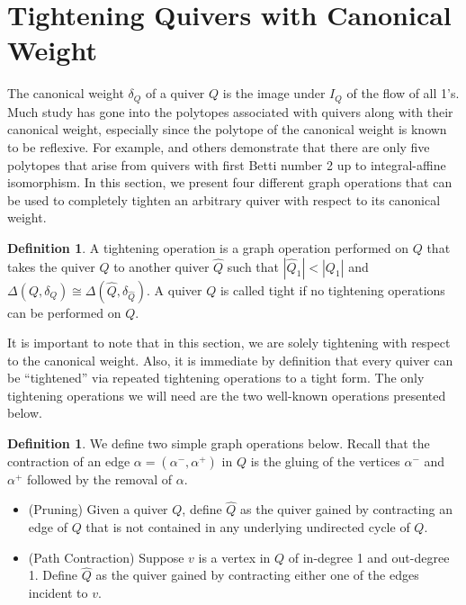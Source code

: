\documentclass[12pt]{amsart}
\theoremstyle{plain}
\theoremstyle{definition}
\newtheorem{definition}[theorem]{Definition}
\begin{document}
\section{Tightening Quivers with Canonical Weight}

The canonical weight $\delta_Q$ of a quiver $Q$ is the image under $I_Q$ of the flow of all 1's. Much study has gone into the polytopes associated with quivers along with their canonical weight, especially since the polytope of the canonical weight is known to be reflexive. For example, \cite{domokos2016equations} and others demonstrate that there are only five polytopes that arise from quivers with first Betti number 2 up to integral-affine isomorphism. In this section, we present four different graph operations that can be used to completely tighten an arbitrary quiver with respect to its canonical weight.

\begin{definition}
    A tightening operation is a graph operation performed on $Q$ that takes the quiver $Q$ to another quiver $\hat Q$ such that $|\hat Q_1| < |Q_1|$ and $\Delta(Q, \delta_Q) \cong \Delta(\hat Q, \delta_{\hat Q})$. A quiver $Q$ is called tight if no tightening operations can be performed on $Q$.
\end{definition}

It is important to note that in this section, we are solely tightening with respect to the canonical weight. Also, it is immediate by definition that every quiver can be ``tightened'' via repeated tightening operations to a tight form. The only tightening operations we will need are the two well-known operations presented below.

\begin{definition} We define two simple graph operations below. Recall that the contraction of an edge $\alpha = (\alpha^- , \alpha^+)$ in $Q$ is the gluing of the vertices $\alpha^-$ and $\alpha^+$ followed by the removal of $\alpha$.
\begin{itemize}
    \item[(i)](Pruning)
    Given a quiver $Q$, define $\hat Q$ as the quiver gained by contracting an edge of $Q$ that is not contained in any underlying undirected cycle of $Q$.
    \item[(ii)](Path Contraction)
    Suppose $v$ is a vertex in $Q$ of in-degree 1 and out-degree 1. Define $\hat Q$ as the quiver gained by contracting either one of the edges incident to $v$.
\end{itemize}
\end{definition}
\end{document}
